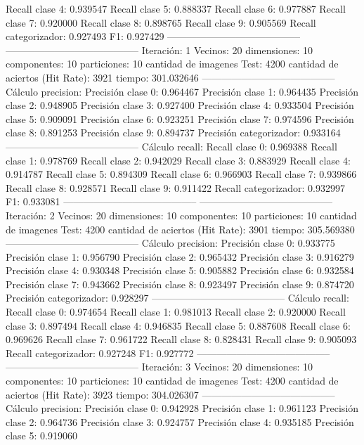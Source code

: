 Recall clase 4: 0.939547
Recall clase 5: 0.888337
Recall clase 6: 0.977887
Recall clase 7: 0.920000
Recall clase 8: 0.898765
Recall clase 9: 0.905569
Recall categorizador: 0.927493
F1: 0.927429
-----------------------------------------
-----------------------------------------
Iteración: 1
Vecinos: 20
dimensiones: 10
componentes: 10
particiones: 10
cantidad de imagenes Test: 4200
cantidad de aciertos (Hit Rate): 3921
tiempo: 301.032646
-----------------------------------------
Cálculo precision: 
Precisión clase 0: 0.964467
Precisión clase 1: 0.964435
Precisión clase 2: 0.948905
Precisión clase 3: 0.927400
Precisión clase 4: 0.933504
Precisión clase 5: 0.909091
Precisión clase 6: 0.923251
Precisión clase 7: 0.974596
Precisión clase 8: 0.891253
Precisión clase 9: 0.894737
Precisión categorizador: 0.933164
-----------------------------------------
Cálculo recall: 
Recall clase 0: 0.969388
Recall clase 1: 0.978769
Recall clase 2: 0.942029
Recall clase 3: 0.883929
Recall clase 4: 0.914787
Recall clase 5: 0.894309
Recall clase 6: 0.966903
Recall clase 7: 0.939866
Recall clase 8: 0.928571
Recall clase 9: 0.911422
Recall categorizador: 0.932997
F1: 0.933081
-----------------------------------------
-----------------------------------------
Iteración: 2
Vecinos: 20
dimensiones: 10
componentes: 10
particiones: 10
cantidad de imagenes Test: 4200
cantidad de aciertos (Hit Rate): 3901
tiempo: 305.569380
-----------------------------------------
Cálculo precision: 
Precisión clase 0: 0.933775
Precisión clase 1: 0.956790
Precisión clase 2: 0.965432
Precisión clase 3: 0.916279
Precisión clase 4: 0.930348
Precisión clase 5: 0.905882
Precisión clase 6: 0.932584
Precisión clase 7: 0.943662
Precisión clase 8: 0.923497
Precisión clase 9: 0.874720
Precisión categorizador: 0.928297
-----------------------------------------
Cálculo recall: 
Recall clase 0: 0.974654
Recall clase 1: 0.981013
Recall clase 2: 0.920000
Recall clase 3: 0.897494
Recall clase 4: 0.946835
Recall clase 5: 0.887608
Recall clase 6: 0.969626
Recall clase 7: 0.961722
Recall clase 8: 0.828431
Recall clase 9: 0.905093
Recall categorizador: 0.927248
F1: 0.927772
-----------------------------------------
-----------------------------------------
Iteración: 3
Vecinos: 20
dimensiones: 10
componentes: 10
particiones: 10
cantidad de imagenes Test: 4200
cantidad de aciertos (Hit Rate): 3923
tiempo: 304.026307
-----------------------------------------
Cálculo precision: 
Precisión clase 0: 0.942928
Precisión clase 1: 0.961123
Precisión clase 2: 0.964736
Precisión clase 3: 0.924757
Precisión clase 4: 0.935185
Precisión clase 5: 0.919060
